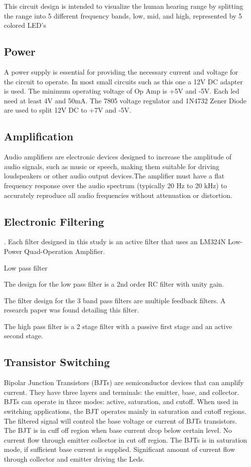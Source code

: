 \documentclass[12pt,a4paper]{article}
\begin{document}
{    This circuit design is intended to visualize the human hearing range by splitting the range into 5 different frequency bands, low, mid, and high, represented by 5 colored LED's

    \subsection*{\fontsize{10}{11}\selectfont Power}
     A power supply is essential for providing the necessary current and voltage for the circuit to operate. In most small circuits such as this one a 12V DC adapter is used. The minimum operating voltage of Op Amp is +5V and -5V. Each led need at least 4V and 50mA.  The 7805 voltage regulator and 1N4732 Zener Diode are used to split 12V DC to +7V and  -5V.
     
    
     
    \subsection*{\fontsize{10}{11}\selectfont Amplification}
    Audio amplifiers are electronic devices designed to increase the amplitude of audio signals, such as music or speech, making them suitable for driving loudspeakers or other audio output devices.The amplifier must have a flat frequency response over the audio spectrum (typically 20 Hz to 20 kHz) to accurately reproduce all audio frequencies without attenuation or distortion.
    \subsection*{\fontsize{10}{11}\selectfont Electronic Filtering}
. 
        Each filter designed in this study is an active filter that uses an LM324N Low-Power Quad-Operation Amplifier.
        
        Low pass filter

        The design for the low pass filter is a 2nd order RC filter with unity gain. 

        The filter design for the 3 band pass filters are multiple feedback filters. A research paper was found detailing this filter.

        The high pass filter is a 2 stage filter with a passive first stage and an active second stage.
        
    \subsection*{\fontsize{10}{11}\selectfont Transistor Switching}
    Bipolar Junction Transistors (BJTs) are semiconductor devices that can amplify current. They have three layers and terminals: the emitter, base, and collector. BJTs can operate in three modes: active, saturation, and cutoff. When used in switching applications, the BJT operates mainly in saturation and cutoff regions. The filtered signal will control the base voltage or current of BJTs transistors. The BJT is in cuff off region when base current drop below certain level. No current flow through emitter collector in cut off region. The BJTs is in saturation mode, if sufficient base current is supplied. Significant amount of current flow through collector and emitter driving the Leds. 
}
\end{document}
